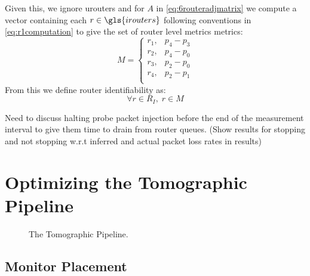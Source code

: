     Given this, we ignore \gls{urouters} and for $A$ in \cref{eq:6routeradjmatrix} we compute a vector containing each $r \in \gls{irouters}$ following conventions in \cref{eq:r1computation} to give the set of router level metrics \gls{metrics}:
    \begin{equation*}
        M = 
        \begin{cases}
        r_1, & p_4-p_3\\
        r_2, & p_4-p_0\\
        r_3, & p_2-p_0\\
        r_4, & p_2-p_1\\
        \end{cases}
    \end{equation*}
    From this we define router identifiability as:
    \begin{equation}
    \label{eq:identifiability}
        \forall r \in R_I,\;r \in M 
    \end{equation}


Need to discuss halting probe packet injection before the end of the measurement interval to give them time to drain from router queues. (Show results for stopping and not stopping w.r.t inferred and actual packet loss rates in results)

\section{Optimizing the Tomographic Pipeline}
\label{sec:Moptprobing}
\begin{figure}[H]
    \centering
    \caption{The Tomographic Pipeline.}
\end{figure}

\subsection{Monitor Placement}

